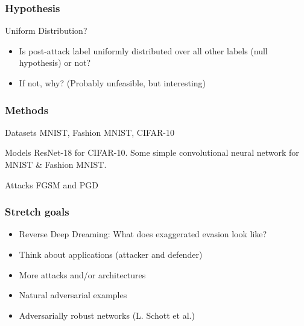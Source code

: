 \documentclass[10pt,usepdftitle=false,aspectratio=169]{beamer}
\begin{document}
\begin{frame}[fragile]
	\frametitle{Hypothesis}
			\begin{block}{Uniform Distribution?}
				\begin{itemize}
					\item Is post-attack label uniformly distributed over all other labels (null hypothesis) or not?
					\item If not, why? (Probably unfeasible, but interesting)
				\end{itemize}
			\end{block}
\end{frame}

\begin{frame}[fragile]
	\frametitle{Methods}
		\begin{block}{Datasets}
			MNIST, Fashion MNIST, CIFAR-10
		\end{block}
		\begin{block}{Models}
			ResNet-18 for CIFAR-10.
			Some simple convolutional neural network for MNIST \& Fashion MNIST.
		\end{block}
		\begin{alertblock}{Attacks}
			FGSM and PGD
		\end{alertblock}

\end{frame}

\begin{frame}[fragile]
	\frametitle{Stretch goals}
	\begin{itemize}
		\item Reverse Deep Dreaming: What does exaggerated evasion look like?
		\item Think about applications (attacker and defender)
		\item More attacks and/or architectures
		\item Natural adversarial examples
		\item Adversarially robust networks (L. Schott et al.) 
	\end{itemize}
\end{frame}
\end{document}
